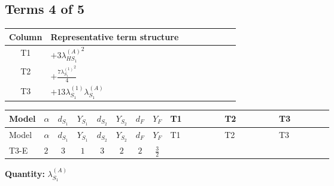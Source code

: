 \documentclass[8pt]{article}
\begin{document}
\begin{landscape}
\subsection*{Terms 4 of 5}
\begin{center}
\begin{tabular}{@{}c >{\raggedright\arraybackslash}p{0.82\linewidth}@{}}
\toprule
Column & Representative term structure \\
\midrule
T1 & \(\displaystyle +3 {\lambda_{HS_1}^{(A)}}^2\) \\
\midrule
T2 & \(\displaystyle +\frac{7 {\lambda_{S_1}^{(1)}}^2}{4}\) \\
\midrule
T3 & \(\displaystyle +13 {\lambda_{S_1}^{(1)}} {\lambda_{S_1}^{(A)}}\) \\
\midrule
\bottomrule
\end{tabular}
\end{center}
\smallskip
\tiny
\begin{longtable}{@{}llcccccc >{\raggedright\arraybackslash}p{0.21\linewidth} >{\raggedright\arraybackslash}p{0.21\linewidth} >{\raggedright\arraybackslash}p{0.21\linewidth}@{}}
\toprule
Model & $\alpha$ & $d_{S_1}$ & $Y_{S_1}$ & $d_{S_2}$ & $Y_{S_2}$ & $d_F$ & $Y_F$ & T1 & T2 & T3 \\
\midrule
\endfirsthead
\toprule
Model & $\alpha$ & $d_{S_1}$ & $Y_{S_1}$ & $d_{S_2}$ & $Y_{S_2}$ & $d_F$ & $Y_F$ & T1 & T2 & T3 \\
\midrule
\endhead
T3-E & $2$ & $3$ & $1$ & $3$ & $2$ & $2$ & $\frac{3}{2}$ & \scriptsize\adjustbox{max width=\linewidth}{$\begin{gathered} +3 {\lambda_{HS_1}^{(A)}}^2\end{gathered}$} & \scriptsize\adjustbox{max width=\linewidth}{$\begin{gathered} +\frac{7 {\lambda_{S_1}^{(1)}}^2}{4}\end{gathered}$} & \scriptsize\adjustbox{max width=\linewidth}{$\begin{gathered} +13 {\lambda_{S_1}^{(1)}} {\lambda_{S_1}^{(A)}}\end{gathered}$} \\
\midrule
\bottomrule
\end{longtable}
\clearpage
\noindent\textbf{Quantity: }$\lambda_{S_1}^{(A)}$\par\smallskip

\end{landscape}
\end{document}
